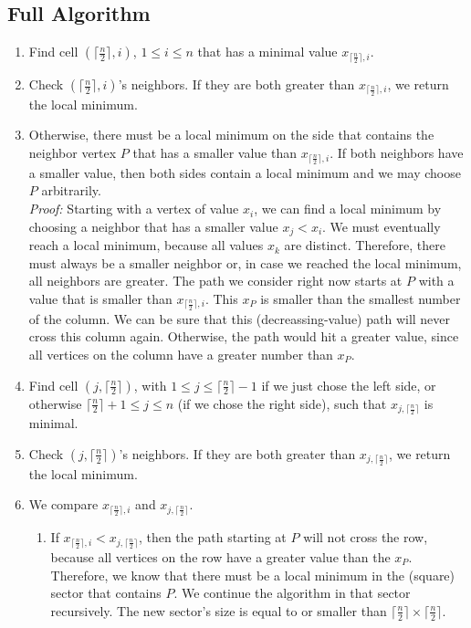 \documentclass[12pt]{article}
\begin{document}
\subsection*{Full Algorithm}
\begin{enumerate}
	\item Find cell $\left( \lceil \frac{n}{2} \rceil, i \right)$, $1 \leq i \leq n$ that has a minimal value $x_{\lceil \frac{n}{2} \rceil, i}$.
	\item Check $\left( \lceil \frac{n}{2} \rceil, i \right)$'s neighbors. If they are both greater than $x_{\lceil \frac{n}{2} \rceil, i}$, we return the local minimum.
	\item Otherwise, there must be a local minimum on the side that contains the neighbor vertex $P$ that has a smaller value than $x_{\lceil \frac{n}{2} \rceil, i}$. If both neighbors have a smaller value, then both sides contain a local minimum and we may choose $P$ arbitrarily. \\
\emph{Proof:} Starting with a vertex of value $x_i$, we can find a local minimum by choosing a neighbor that has a smaller value $x_j < x_i$. We must eventually reach a local minimum, because all values $x_k$ are distinct. Therefore, there must always be a smaller neighbor or, in case we reached the local minimum, all neighbors are greater. The path we consider right now starts at $P$ with a value that is smaller than $x_{\lceil \frac{n}{2} \rceil, i}$. This $x_P$ is smaller than the smallest number of the column. We can be sure that this (decreassing-value) path will never cross this column again. Otherwise, the path would hit a greater value, since all vertices on the column have a greater number than $x_P$.
	\item Find cell $\left( j, \lceil \frac{n}{2} \rceil \right)$, with $1 \leq j \leq \lceil \frac{n}{2} \rceil - 1$ if we just chose the left side, or otherwise $\lceil \frac{n}{2} \rceil + 1 \leq j \leq n$ (if we chose the right side), such that $x_{j, \lceil \frac{n}{2} \rceil}$ is minimal.
	\item Check $\left( j, \lceil \frac{n}{2} \rceil \right)$'s neighbors. If they are both greater than $x_{j, \lceil \frac{n}{2} \rceil}$, we return the local minimum.
	\item We compare $x_{\lceil \frac{n}{2} \rceil, i}$ and $x_{j, \lceil \frac{n}{2} \rceil}$. \begin{enumerate}
		\item If $x_{\lceil \frac{n}{2} \rceil, i} < x_{j, \lceil \frac{n}{2} \rceil}$, then the path starting at $P$ will not cross the row, because all vertices on the row have a greater value than the $x_{P}$. Therefore, we know that there must be a local minimum in the (square) sector that contains $P$. We continue the algorithm in that sector recursively. The new sector's size is equal to or smaller than $\lceil \frac{n}{2} \rceil \times \lceil \frac{n}{2} \rceil$.

\end{enumerate}
\end{enumerate}
\end{document}
